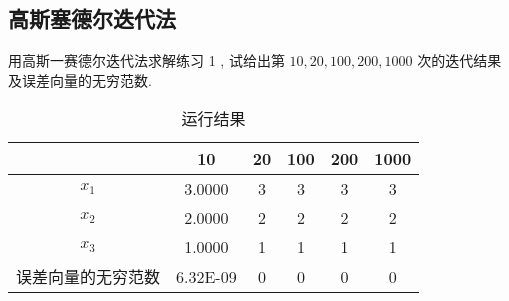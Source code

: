 \subsection{高斯塞德尔迭代法}
\begin{ex}
	用高斯一赛德尔迭代法求解练习 1 , 试给出第 $10,20,100,200,1000$ 次的迭代结果及误差向量的无穷范数.
\end{ex}

\qa 
\begin{table}[H]
	\centering
	\caption{运行结果}
	\begin{tabular}{c|ccccc}
		& 10    & 20    & 100   & 200   & 1000 \\
		\hline
		$x_1$    & 3.0000 & 3     & 3     & 3     & 3 \\
		$x_2$    & 2.0000 & 2     & 2     & 2     & 2 \\
		$x_3$    & 1.0000 & 1     & 1     & 1     & 1 \\
		误差向量的无穷范数 & 6.32E-09 & 0     & 0     & 0     & 0 \\
	\end{tabular}%
	\label{tab:addlabel15-2}%
\end{table}%

